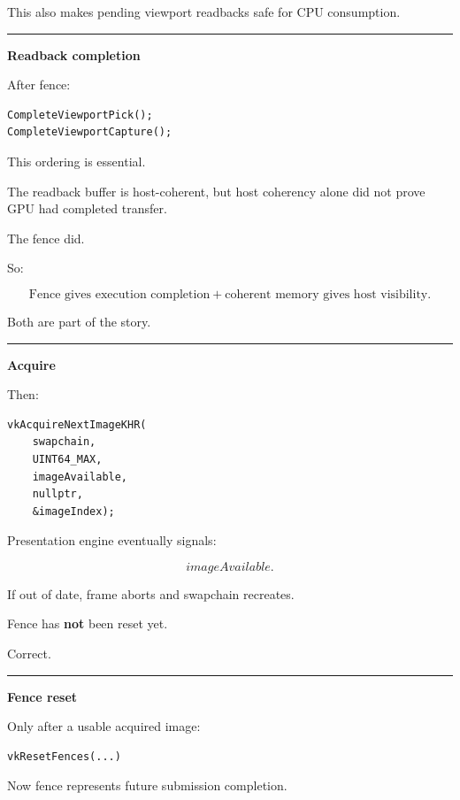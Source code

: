 This also makes pending viewport readbacks safe for CPU consumption.

\begin{center}\rule{0.5\linewidth}{0.5pt}\end{center}

\textbf{Readback completion}

After fence:

\begin{verbatim}
CompleteViewportPick();
CompleteViewportCapture();
\end{verbatim}

This ordering is essential.

The readback buffer is host-coherent, but host coherency alone did not prove GPU had completed transfer.

The fence did.

So:

\[
\boxed{
\text{Fence gives execution completion}
+
\text{coherent memory gives host visibility}.
}
\]

Both are part of the story.

\begin{center}\rule{0.5\linewidth}{0.5pt}\end{center}

\textbf{Acquire}

Then:

\begin{verbatim}
vkAcquireNextImageKHR(
    swapchain,
    UINT64_MAX,
    imageAvailable,
    nullptr,
    &imageIndex);
\end{verbatim}

Presentation engine eventually signals:

\[
imageAvailable.
\]

If out of date, frame aborts and swapchain recreates.

Fence has \textbf{not} been reset yet.

Correct.

\begin{center}\rule{0.5\linewidth}{0.5pt}\end{center}

\textbf{Fence reset}

Only after a usable acquired image:

\begin{verbatim}
vkResetFences(...)
\end{verbatim}

Now fence represents future submission completion.

